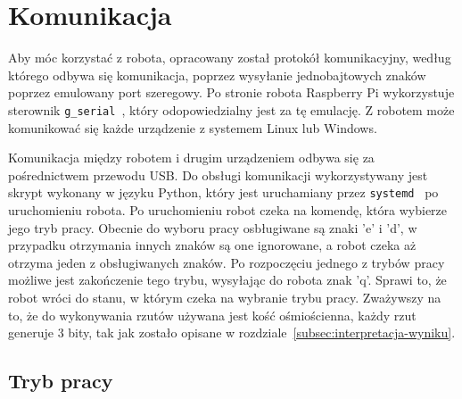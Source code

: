 \chapter{Komunikacja}\label{ch:komunikacja}
Aby móc korzystać z robota, opracowany został protokół komunikacyjny, według którego
odbywa się komunikacja, poprzez wysyłanie jednobajtowych znaków poprzez emulowany port szeregowy. Po stronie robota Raspberry Pi wykorzystuje
sterownik \texttt{g\_serial}~\cite{g_serial}, który odopowiedzialny jest za tę emulację. Z robotem może komunikować się 
każde urządzenie z systemem Linux lub Windows. 

Komunikacja między robotem i drugim urządzeniem odbywa się za pośrednictwem przewodu USB.
Do obsługi komunikacji wykorzystywany jest skrypt wykonany w języku Python, który jest uruchamiany 
przez \texttt{systemd}~\cite{systemd} po uruchomieniu robota. Po uruchomieniu robot czeka na komendę, która wybierze jego tryb pracy.
Obecnie do wyboru pracy osbługiwane są znaki 'e' i 'd', w przypadku otrzymania innych znaków są one ignorowane, a robot czeka aż otrzyma jeden z obsługiwanych znaków.
Po rozpoczęciu jednego z trybów pracy możliwe jest zakończenie tego trybu, wysyłając do robota znak 'q'. Sprawi to, że robot wróci do stanu, w którym czeka na wybranie 
trybu pracy. Zważywszy na to, że do wykonywania rzutów używana jest kość ośmiościenna, 
każdy rzut generuje 3 bity, tak jak zostało opisane w rozdziale~\ref{subsec:interpretacja-wyniku}.


\section{Tryb pracy} \label{sec:tryby}

